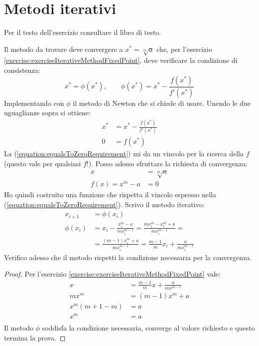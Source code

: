 \section{Metodi iterativi}

\begin{exercise}[2.2]
	Per il testo dell'esercizio consultare il libro di testo.
\end{exercise}
Il metodo da trovare deve convergere a $x^{*} = \sqrt[m]{a}$ che, per l'esercizio
\ref{exercise:exerciseIterativeMethodFixedPoint}, deve verificare la condizione 
di consistenza:
\begin{displaymath}
	x^{*}=\phi(x^{*}), \quad \quad \phi(x^{*}) = x^{*} - 
		\frac{f(x^{*})}{f'(x^{*})}
\end{displaymath}
Implementando con $\phi$ il metodo di Newton che si chiede di usare.
Unendo le due uguaglianze sopra si ottiene:
\begin{equation}
\label{equation:equalsToZeroRequirement}
\begin{split}
	x^{*} &= x^{*} - \frac{f(x^{*})}{f'(x^{*})} \\
	0 &= f(x^{*})
\end{split}
\end{equation}
La (\ref{equation:equalsToZeroRequirement}) mi da un vincolo per la ricerca
della $f$ (questo vale per qualsiasi $f$!). Posso adesso sfruttare la richiesta
di convergenza:
\begin{equation}
\begin{split}
	x &= \sqrt[m]{a} \\
	f(x) = x^{m} - a &= 0
\end{split}
\end{equation}
Ho quindi costruito una funzione che rispetta il vincolo espresso nella
(\ref{equation:equalsToZeroRequirement}). Scrivo il metodo iterativo:
\begin{displaymath}
\begin{split}
	x_{i+1} &=\phi(x_{i}) \\
	\phi(x_{i}) &= x_{i} - 
		\frac{x_{i}^{m} - a}{m x_{i}^{m - 1}} = 
		\frac{m x_{i}^{m} - x_{i}^{m} + a}{m x_{i}^{m - 1}} = \\
	&= 	\frac{(m - 1) x_{i}^{m} + a}{m x_{i}^{m - 1}} = 
			\frac{m - 1}{m} x_{i} + \frac{a}{m x_{i}^{m - 1}}
\end{split}
\end{displaymath}
Verifico adesso che il metodo rispetti la condizione necessaria per la convergenza.
\begin{proof}
Per l'esercizio \ref{exercise:exerciseIterativeMethodFixedPoint} vale:
\begin{equation}
\begin{split}
	x &= \frac{m - 1}{m} x + \frac{a}{m x^{m - 1}} \\
	m x^{m} &= (m - 1) x^{m} + a \\
	x^{m} (m + 1 - m) &= a \\
	x^{m} &= a \\
\end{split}
\end{equation}
Il metodo $\phi$ soddisfa la condizione necessaria, converge al valore
richiesto e questo termina la prova.
\end{proof}

